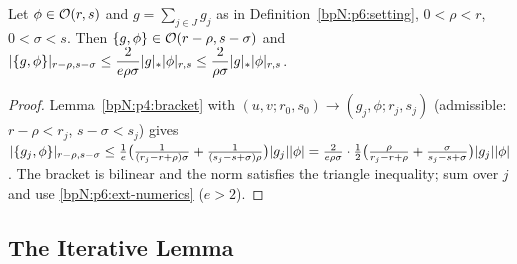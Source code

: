 \begin{lemma}\label{bpN:p6:bracket-g}
Let $\phi\in\mathcal O(r,s)$ and $g=\sum_{j\in J}g_j$ as in Definition~\ref{bpN:p6:setting}, $0<\rho<r$, $0<\sigma<s$. Then $\{g,\phi\}\in\mathcal O(r-\rho,s-\sigma)$ and
$\lvert \{g,\phi\}\rvert_{r-\rho,s-\sigma}\le\dfrac2{e\rho\sigma}\lvert g\rvert_*\lvert \phi\rvert_{r,s}\le\dfrac2{\rho\sigma}\lvert g\rvert_*\lvert \phi\rvert_{r,s}$.
\end{lemma}
\begin{proof}
\label{stepN:p6:bg-term} Lemma~\ref{bpN:p4:bracket} with $(u,v;r_0,s_0)\to(g_j,\phi;r_j,s_j)$ (admissible: $r-\rho<r_j$, $s-\sigma<s_j$) gives $\lvert \{g_j,\phi\}\rvert_{r-\rho,s-\sigma}\le\frac1e\bigl(\frac1{(r_j-r+\rho)\sigma}+\frac1{(s_j-s+\sigma)\rho}\bigr)\lvert g_j\rvert\lvert \phi\rvert=\frac2{e\rho\sigma}\cdot\frac12\bigl(\frac\rho{r_j-r+\rho}+\frac\sigma{s_j-s+\sigma}\bigr)\lvert g_j\rvert\lvert \phi\rvert$.
\label{stepN:p6:bg-sum} The bracket is bilinear and the norm satisfies the triangle inequality; sum over $j$ and use \ref{bpN:p6:ext-numerics} ($e>2$).
\end{proof}

\subsection{The Iterative Lemma}\label{bpN:p6:s-iter}

